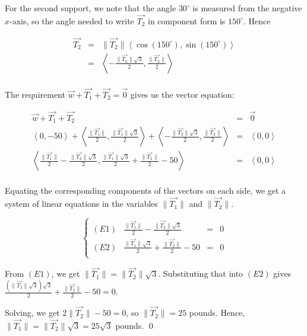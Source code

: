 \documentclass{ximera}
\begin{document}
\begin{example}
\begin{explanation}
For the second support, we note that the angle $30^{\circ}$ is measured from the negative $x$-axis, so the angle needed to write $\overrightarrow{T_2}$ in component form is $150^{\circ}$.  Hence

\[ \begin{array}{rcl}

\overrightarrow{T_2} & = & \| \overrightarrow{T_2} \|\left<\cos\left(150^{\circ}\right), \sin\left(150^{\circ}\right)\right>\\   
                           & =  & \left<-\frac{\| \overrightarrow{T_2} \|\sqrt{3}}{2}, \frac{\| \overrightarrow{T_2} \|}{2} \right> \\ \end{array} \]
                           
The requirement $\overrightarrow{w} + \overrightarrow{T_1} + \overrightarrow{T_2} = \overrightarrow{0}$ gives us the vector equation:
 
 \[ \begin{array}{rcl}
 
\overrightarrow{w} + \overrightarrow{T_1} + \overrightarrow{T_2} &  = &  \overrightarrow{0}  \\   

\left<0,-50\right> + \left< \frac{\| \overrightarrow{T_1} \|}{2} , \frac{\| \overrightarrow{T_1} \|\sqrt{3}}{2}\right> +  \left<-\frac{\| \overrightarrow{T_2} \|\sqrt{3}}{2}, \frac{\| \overrightarrow{T_2} \|}{2} \right> & = & \left<0, 0\right> \\   

\left< \frac{\| \overrightarrow{T_1} \|}{2} -\frac{\| \overrightarrow{T_2} \|\sqrt{3}}{2}, \frac{\| \overrightarrow{T_1} \|\sqrt{3}}{2} +  \frac{\| \overrightarrow{T_2} \|}{2} -50  \right> & = & \left<0, 0\right>  \\ 
\end{array} \]

Equating the corresponding components of the vectors on each side,  we get a system of linear equations in the variables $\| \overrightarrow{T_1} \| $ and   $\| \overrightarrow{T_2} \|$.

\[\left\{ \begin{array}{lrcl} (E1) &  \frac{\| \overrightarrow{T_1} \|}{2} -\frac{\| \overrightarrow{T_2} \|\sqrt{3}}{2} & = & 0 \\     (E2) &  \frac{\| \overrightarrow{T_1} \|\sqrt{3}}{2} +  \frac{\| \overrightarrow{T_2} \|}{2} -50 & = & 0 \\ \end{array} \right.\]

From $(E1)$, we get $\| \overrightarrow{T_1} \| = \| \overrightarrow{T_2} \| \sqrt{3}$.  Substituting that into $(E2)$ gives $\frac{(\| \overrightarrow{T_2} \| \sqrt{3})\sqrt{3}}{2} +  \frac{\| \overrightarrow{T_2} \|}{2} - 50 = 0$.

 

Solving, we get  $2\| \overrightarrow{T_2} \| - 50 =0$, so  $\| \overrightarrow{T_2} \| = 25$ pounds.  Hence,   $\| \overrightarrow{T_1} \| = \| \overrightarrow{T_2} \| \sqrt{3} = 25 \sqrt{3}$ pounds.   \qed
\end{explanation}
\end{example}
\end{document}
